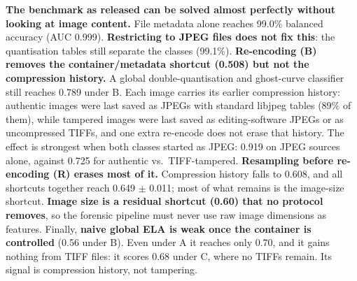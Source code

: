 \textbf{The benchmark as released can be solved almost perfectly without looking at image content.} File metadata
alone reaches 99.0\% balanced accuracy (AUC 0.999). \textbf{Restricting to JPEG files does not fix this}: the
quantisation tables still separate the classes (99.1\%). \textbf{Re-encoding (B) removes the container/metadata
shortcut (0.508) but not the compression history.} A global double-quantisation and ghost-curve classifier still
reaches 0.789 under B. Each image carries its earlier compression history: authentic images were last saved as
JPEGs with standard libjpeg tables (89\% of them), while tampered images were last saved as editing-software JPEGs
or as uncompressed TIFFs, and one extra re-encode does not erase that history. The effect is strongest when both
classes started as JPEG: 0.919 on JPEG sources alone, against 0.725 for authentic vs.\ TIFF-tampered.
\textbf{Resampling before re-encoding (R) erases most of it.} Compression history falls to 0.608, and all shortcuts
together reach 0.649 $\pm$ 0.011; most of what remains is the image-size shortcut. \textbf{Image size is a residual
shortcut (0.60) that no protocol removes}, so the forensic pipeline must never use raw image dimensions as
features. Finally, \textbf{naive global ELA is weak once the container is controlled} (0.56 under B). Even under A
it reaches only 0.70, and it gains nothing from TIFF files: it scores 0.68 under C, where no TIFFs remain. Its
signal is compression history, not tampering.

